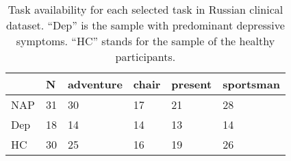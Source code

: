
\begin{table}[ht!]
\begin{center}
\begin{tabular}{llllll}
\hline
    & N   & adventure & chair & present & sportsman \\ \hline
NAP & 31  & 30        & 17    & 21      & 28        \\
Dep & 18  & 14        & 14    & 13      & 14        \\
HC  & 30  & 25        & 16    & 19      & 26        \\ \hline
\end{tabular}
\captionsetup{width=\textwidth}
\caption[Russian Clinical Dataset: Task Availability]{\label{tab:data:ru:sample:tasks} Task availability for each selected task in Russian clinical dataset. ``Dep'' is the sample with predominant depressive symptoms. ``HC'' stands for the sample of the healthy participants.}
\end{center}
\end{table}

